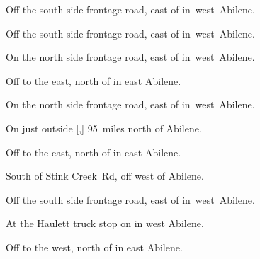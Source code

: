
\begin{LocationList}

Off the south side  frontage road, east of  in~west~Abilene.

Off the south side  frontage road, east of  in~west~Abilene.

\Location{\GarageHQ \Garage}
On the north side  frontage road, east of  in~west~Abilene.

Off  to the east, north of  in east Abilene.

On the north side  frontage road, east of  in~west~Abilene.

On  just outside [,] 95~miles north of Abilene.

Off  to the east, north of  in east Abilene.

South of Stink Creek~Rd, off   west of Abilene.

Off the south side  frontage road, east of  in~west~Abilene.

At the Haulett truck stop on  in west Abilene.

Off  to the west, north of  in east Abilene.

\end{LocationList}
